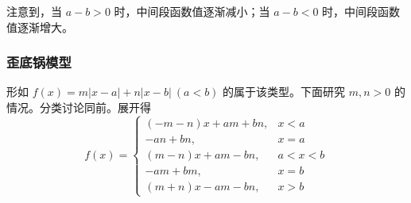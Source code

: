 \documentclass[a4paper,openany]{ctexbook}
\begin{document}
注意到，当 \(a-b>0\) 时，中间段函数值逐渐减小；当 \(a-b<0\) 时，中间段函数值逐渐增大。

\subsubsection{歪底锅模型}

形如 \(f(x)=m|x-a|+n|x-b|\ (a<b)\) 的属于该类型。下面研究 \(m,n>0\) 的情况。分类讨论同前。展开得
\[
    f(x)=
    \begin{cases}
        (-m-n)x+am+bn, & x<a   \\
        -an+bn,        & x=a   \\
        (m-n)x+am-bn,  & a<x<b \\
        -am+bm,        & x=b   \\
        (m+n)x-am-bn,  & x>b
    \end{cases}
\]
\end{document}
